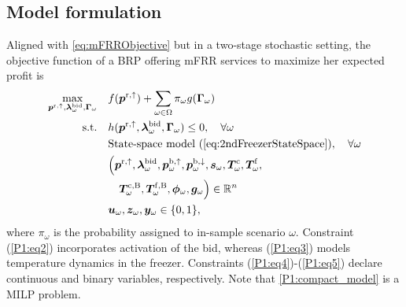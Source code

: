 \subsection{Model formulation}
Aligned with \eqref{eq:mFRRObjective} but in a two-stage stochastic setting, the objective function of a BRP offering mFRR services to maximize her expected profit is
%
\begin{subequations}\label{P1:compact_model}
    \begin{align}
        \underset{\bm{p}^{\rm{r},\uparrow}, \bm{\lambda}_{\omega}^{\text{bid}}, \bm{\Gamma}_{\omega}}{\textrm{max}} \quad & f(\bm{p}^{\rm{r},\uparrow}) + \sum_{\omega \in \Omega} \pi_{\omega} g(\bm{\Gamma}_{\omega}) \label{P1:eq1}
        \\
        \text{s.t.} \quad                                                                                                    & h(\bm{p}^{\rm{r},\uparrow}, \bm{\lambda}_{\omega}^{\text{bid}}, \bm{\Gamma}_{\omega}) \leq 0, \quad \forall{\omega}\label{P1:eq2}                                                                     \\
        \quad                                                                                                        & \text{State-space model } (\ref{eq:2ndFreezerStateSpace}), \quad \forall{\omega} \label{P1:eq3}
        \\
        \quad                                                                                                        & \Bigl( \bm{p}^{\rm{r},\uparrow}, \bm{\lambda}_{\omega}^{\text{bid}}, \bm{p}_{\omega}^{\rm{b},\uparrow}, \bm{p}_{\omega}^{\rm{b},\downarrow}, \bm{s}_{\omega}, \bm{T}_{\omega}^{\rm{c}}, \bm{T}_{\omega}^{\rm{f}}, \notag \\ \quad & \quad \bm{T}_{\omega}^{\rm{c,B}}, \bm{T}_{\omega}^{\rm{f,B}}, \bm{\phi}_{\omega}, \bm{g}_{\omega} \Bigr) \in \mathbb{R}^{n}  \label{P1:eq4}
        \\
        \quad                                                                                                        & \bm{u}_{\omega}, \bm{z}_{\omega}, \bm{y}_{\omega} \in \{0,1\},  \label{P1:eq5}
    \end{align}
\end{subequations}
%
where $\pi_{\omega}$ is the probability assigned to in-sample scenario $\omega$. Constraint (\ref{P1:eq2}) incorporates activation of the bid, whereas (\ref{P1:eq3}) models temperature dynamics in the freezer. Constraints (\ref{P1:eq4})-(\ref{P1:eq5}) declare continuous and binary variables, respectively. Note that \eqref{P1:compact_model} is a MILP problem. 


